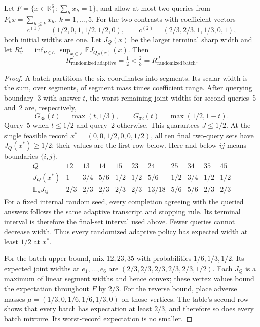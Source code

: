 \begin{theorem}
\label{thm:shared-prefix-separation}
Let $F=\{x\in\mathbb R_+^6:\sum_hx_h=1\}$, and allow at most two
queries from $P_kx=\sum_{h\leq k}x_h$, $k=1,\ldots,5$.  For the two
contrasts with coefficient vectors
\[
 c^{(1)}=(1/2,0,1,1/2,1/2,0),\qquad
 c^{(2)}=(2/3,2/3,1,1/3,0,1),
\]
both initial widths are one.  Let $J_Q(x)$ be the larger terminal sharp
width and let $R^J_{\mathcal C}=\inf_{P\in\mathcal C}\sup_{x\in F}
\mathbb E J_{Q_P(x)}(x)$.  Then
\[
 R^J_{\mathrm{randomized\ adaptive}}=\tfrac12
 <\tfrac23=R^J_{\mathrm{randomized\ batch}}.
\]
\end{theorem}
\begin{proof}
A batch partitions the six coordinates into segments.  Its scalar width
is the sum, over segments, of segment mass times coefficient range.
After querying boundary~3 with answer $t$, the worst remaining joint
widths for second queries~5 and~2 are, respectively,
\[
 G_{35}(t)=\max(t,1/3),\qquad
 G_{32}(t)=\max(1/2,1-t).
\]
Query~5 when $t\leq1/2$ and query~2 otherwise.  This guarantees $J\leq1/2$.
At the single feasible record $x^*=(0,0,1/2,0,0,1/2)$, all ten final
two-query sets have $J_Q(x^*)\geq1/2$; their values are the first row below.
Here and below $ij$ means boundaries $\{i,j\}$.
\[
\begin{array}{c|cccccccccc}
Q&12&13&14&15&23&24&25&34&35&45\\\hline
J_Q(x^*)&1&3/4&5/6&1/2&1/2&5/6&1/2&3/4&1/2&1/2\\
\mathbb E_\mu J_Q&2/3&2/3&2/3&2/3&2/3&13/18&5/6&5/6&2/3&2/3
\end{array}
\]
For a fixed internal random seed, every completion agreeing with the
queried answers follows the same adaptive transcript and stopping rule.
Its terminal interval is therefore the final-set interval used above.
Fewer queries cannot decrease width.  Thus every randomized adaptive
policy has expected width at least $1/2$ at $x^*$.

For the batch upper bound, mix $12,23,35$ with probabilities
$1/6,1/3,1/2$.  Its expected joint widths at $e_1,\ldots,e_6$ are
$(2/3,2/3,2/3,2/3,2/3,1/2)$.  Each $J_Q$ is a maximum of linear segment
widths and hence convex; these vertex values bound the expectation
throughout $F$ by $2/3$.  For the reverse bound, place adverse masses
$\mu=(1/3,0,1/6,1/6,1/3,0)$ on those vertices.  The table's second row
shows that every batch has expectation at least $2/3$, and therefore so
does every batch mixture.  Its worst-record expectation is no smaller.
\end{proof}
